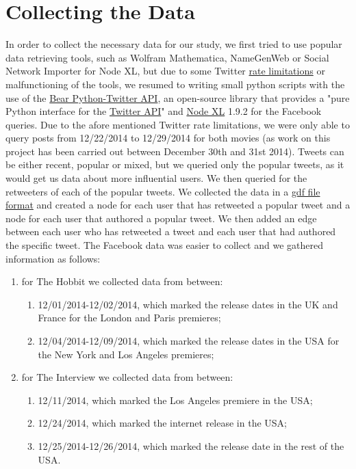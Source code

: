 \documentclass{llncs}
\begin{document}
\section{Collecting the Data}
In order to collect the necessary data for our study, we first tried to use
popular data retrieving tools, such as Wolfram Mathematica, NameGenWeb or Social
Network Importer for Node XL, but due to some Twitter
\href{https://dev.twitter.com/rest/public/rate-limiting}{rate limitations} or
malfunctioning of the tools, we resumed to writing small python scripts with the
use of the \href{https://github.com/bear/python-twitter}{Bear Python-Twitter
API}, an open-source library that provides a "pure Python interface for the
\href{https://dev.twitter.com/rest/public}{Twitter API}" and
\href{http://nodexl.codeplex.com/}{Node XL} 1.9.2 for
the Facebook queries. Due to the afore mentioned Twitter rate limitations, we
were only able to query posts from 12/22/2014 to 12/29/2014 for both movies (as
work on this project has been carried out between December 30th and 31st 2014).
Tweets can be either recent, popular or mixed, but we queried only the
popular tweets, as it would get us data about more influential users. We then
queried for the retweeters of each of the popular tweets. We collected the data
in a \href{https://gephi.org/users/supported-graph-formats/gdf-format/}{gdf file
format} and created a node for each user that has retweeted a popular tweet and
a node for each user that authored a popular tweet. We then added an edge
between each user who has retweeted a tweet and each user that had authored the
specific tweet. The Facebook data was easier to collect and we gathered
information as follows:
\begin{enumerate}
\item for The Hobbit we collected data from between:
    \begin{enumerate}
    \item 12/01/2014-12/02/2014, which marked the release dates in the UK and
        France for the London and Paris premieres;
    \item 12/04/2014-12/09/2014, which marked the release dates in the USA for
        the New York and Los Angeles premieres;
    \end{enumerate}
\item for The Interview we collected data from between:
    \begin{enumerate}
    \item 12/11/2014, which marked the Los Angeles premiere in the USA;
    \item 12/24/2014, which marked the internet release in the USA;
    \item 12/25/2014-12/26/2014, which marked the release date in the rest of
        the USA.
    \end{enumerate}
\end{enumerate}
\end{document}
